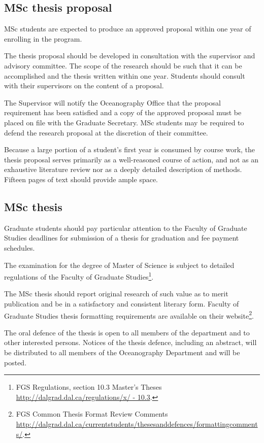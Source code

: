 \documentclass{article}
\newcommand\elink[1]{\url{#1}}
\begin{document}
\subsection{MSc thesis proposal}

MSc students are expected to produce an approved proposal within one year of
enrolling in the program.

The thesis proposal should be developed in consultation with the supervisor and
advisory committee. The scope of the research should be such that it can be
accomplished and the thesis written within one year. Students should consult
with their supervisors on the content of a proposal.

The Supervisor will notify the Oceanography Office that the proposal
requirement has been satisfied and a copy of the approved proposal must be
placed on file with the Graduate Secretary. MSc students may be required to
defend the research proposal at the discretion of their committee.

Because a large portion of a student’s first year is consumed by course work,
the thesis proposal serves primarily as a well-reasoned course of action, and
not as an exhaustive literature review nor as a deeply detailed description of
methods. Fifteen pages of text should provide ample space.


\subsection{MSc thesis}

Graduate students should pay particular attention to the Faculty of Graduate
Studies deadlines for submission of a thesis for graduation and fee payment
schedules.
 
The examination for the degree of Master of Science is subject to detailed
regulations of the Faculty of Graduate Studies\footnote{FGS Regulations,
section 10.3 Master’s Theses \elink{http://dalgrad.dal.ca/regulations/x/ -
10.3}.}.

The MSc thesis should report original research of such value as to merit
publication and be in a satisfactory and consistent literary form. Faculty of
Graduate Studies thesis formatting requirements are available on their
website\footnote{FGS Common Thesis Format Review Comments
\elink{http://dalgrad.dal.ca/currentstudents/thesesanddefences/formattingcomments/}.}.


The oral defence of the thesis is open to all members of the department and to
other interested persons. Notices of the thesis defence, including an abstract,
will be distributed to all members of the Oceanography Department and will be
posted.
\end{document}
